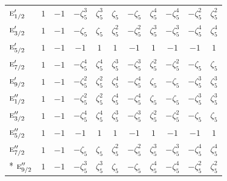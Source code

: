 \documentclass[10pt,a4paper]{article}
\makeatletter
\def\grouprule#1#2{\noalign{\marks\LTgroupmarks{\the\belowrulesep}\nobreak\vskip#1%
  \vskip\aboverulesep}\multispan\LT@cols\unskip{\leaders\hrule\@height#2\hfill\kern\z@}\cr
  \noalign{\penalty\LTrulebreak\vskip\belowrulesep\global\@lastruleclass\z@}}
\numberwithin{equation}{section}
\newcommand{\irr}[1]{\text{\normalfont\scshape #1}}
\newcommand{\rootunity}[1]{\zeta_{#1}}
\makeatother
\begin{document}
{\begin{longtable}{@{}lcccccccccc@{}}
\grouprule{0pt}{\lightrulewidth}
$\irr{e}_{1/2}'$ & $1$ & $-1$ & $-\rootunity{5}^{3}$ & $\rootunity{5}^{3}$ & $\rootunity{5}$ & $-\rootunity{5}$ & $\rootunity{5}^{4}$ & $-\rootunity{5}^{4}$ & $-\rootunity{5}^{2}$ & $\rootunity{5}^{2}$\\
$\irr{e}_{3/2}'$ & $1$ & $-1$ & $-\rootunity{5}$ & $\rootunity{5}$ & $\rootunity{5}^{2}$ & $-\rootunity{5}^{2}$ & $\rootunity{5}^{3}$ & $-\rootunity{5}^{3}$ & $-\rootunity{5}^{4}$ & $\rootunity{5}^{4}$\\
$\irr{e}_{5/2}'$ & $1$ & $-1$ & $-1$ & $1$ & $1$ & $-1$ & $1$ & $-1$ & $-1$ & $1$\\
$\irr{e}_{7/2}'$ & $1$ & $-1$ & $-\rootunity{5}^{4}$ & $\rootunity{5}^{4}$ & $\rootunity{5}^{3}$ & $-\rootunity{5}^{3}$ & $\rootunity{5}^{2}$ & $-\rootunity{5}^{2}$ & $-\rootunity{5}$ & $\rootunity{5}$\\
$\irr{e}_{9/2}'$ & $1$ & $-1$ & $-\rootunity{5}^{2}$ & $\rootunity{5}^{2}$ & $\rootunity{5}^{4}$ & $-\rootunity{5}^{4}$ & $\rootunity{5}$ & $-\rootunity{5}$ & $-\rootunity{5}^{3}$ & $\rootunity{5}^{3}$\\
$\irr{e}_{1/2}''$ & $1$ & $-1$ & $-\rootunity{5}^{2}$ & $\rootunity{5}^{2}$ & $\rootunity{5}^{4}$ & $-\rootunity{5}^{4}$ & $\rootunity{5}$ & $-\rootunity{5}$ & $-\rootunity{5}^{3}$ & $\rootunity{5}^{3}$\\
$\irr{e}_{3/2}''$ & $1$ & $-1$ & $-\rootunity{5}^{4}$ & $\rootunity{5}^{4}$ & $\rootunity{5}^{3}$ & $-\rootunity{5}^{3}$ & $\rootunity{5}^{2}$ & $-\rootunity{5}^{2}$ & $-\rootunity{5}$ & $\rootunity{5}$\\
$\irr{e}_{5/2}''$ & $1$ & $-1$ & $-1$ & $1$ & $1$ & $-1$ & $1$ & $-1$ & $-1$ & $1$\\
$\irr{e}_{7/2}''$ & $1$ & $-1$ & $-\rootunity{5}$ & $\rootunity{5}$ & $\rootunity{5}^{2}$ & $-\rootunity{5}^{2}$ & $\rootunity{5}^{3}$ & $-\rootunity{5}^{3}$ & $-\rootunity{5}^{4}$ & $\rootunity{5}^{4}$\\*
$\irr{e}_{9/2}''$ & $1$ & $-1$ & $-\rootunity{5}^{3}$ & $\rootunity{5}^{3}$ & $\rootunity{5}$ & $-\rootunity{5}$ & $\rootunity{5}^{4}$ & $-\rootunity{5}^{4}$ & $-\rootunity{5}^{2}$ & $\rootunity{5}^{2}$\\
\bottomrule\end{longtable}}
\end{document}
